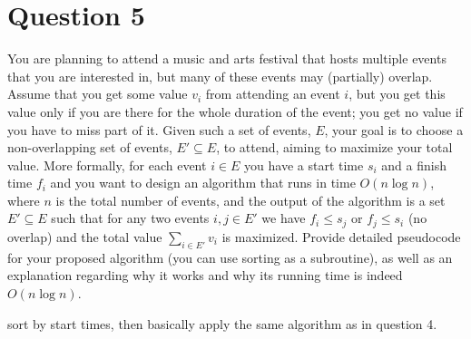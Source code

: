 \documentclass{article}
\begin{document}
\section*{Question 5}
You are planning to attend a music and arts festival that hosts multiple events that
you are interested in, but many of these events may (partially) overlap. Assume that you get some value
$v_i$ from attending an event $i$, but you get this value only if you are there for the whole duration
of the event; you get no value if you have to miss part of it. Given such a set of events, $E$, your
goal is to choose a non-overlapping set of events, $E'\subseteq E$, to attend, aiming to maximize your
total value. More formally, for each event $i\in E$ you have a start time $s_i$ and a finish time $f_i$ and
you want to design an algorithm that runs in time $O(n\log n)$, where $n$ is the total number of events,
and the output of the algorithm is a set $E'\subseteq E$ such that for any two events $i,j\in E'$ we have
$f_i\leq s_j$ or $f_j \leq s_i$ (no overlap) and the total value $\sum_{i\in E'} v_i$ is maximized. Provide
detailed pseudocode for your proposed algorithm (you can use sorting as a subroutine), as well as an explanation
regarding why it works and why its running time is indeed $O(n\log n)$.

sort by start times, then basically apply the same algorithm as in question 4.
\end{document}
